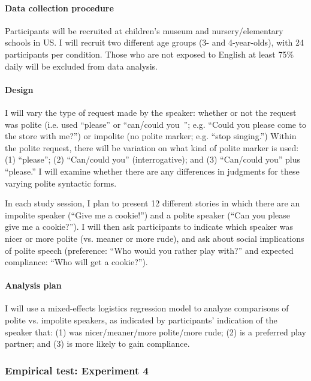 \paragraph{Data collection procedure} Participants will be recruited at children's museum and nursery/elementary schools in US. I will recruit two different age groups (3- and 4-year-olds), with 24 participants per condition. Those who are not exposed to English at least 75\% daily will be excluded from data analysis. 

\paragraph{Design} I will vary the type of request made by the speaker: whether or not the request was polite (i.e. used ``please'' or ``can/could you~''; e.g. ``Could you please come to the store with me?'') or impolite (no polite marker; e.g. ``stop singing.'') Within the polite request, there will be variation on what kind of polite marker is used: (1) ``please''; (2) ``Can/could you'' (interrogative); and (3) ``Can/could you'' plus ``please.'' I will examine whether there are any differences in judgments for these varying polite syntactic forms. 

In each study session, I plan to present 12 different stories in which there are an impolite speaker (``Give me a cookie!'') and a polite speaker (``Can you please give me a cookie?''). I will then ask participants to indicate which speaker was nicer or more polite (vs. meaner or more rude), and ask about social implications of polite speech (preference: ``Who would you rather play with?'' and expected compliance: ``Who will get a cookie?''). 

\paragraph{Analysis plan} I will use a mixed-effects logistics regression model to analyze comparisons of polite vs. impolite speakers, as indicated by participants' indication of the speaker that: (1) was nicer/meaner/more polite/more rude; (2) is a preferred play partner; and (3) is more likely to gain compliance.

\subsubsection{Empirical test: Experiment 4}

